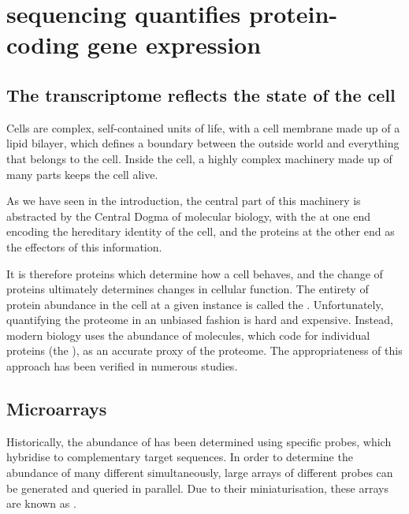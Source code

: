 \chapter{ sequencing quantifies protein-coding gene expression}

\section{The transcriptome reflects the state of the cell}

Cells are complex, self-contained units of life, with a cell membrane made up of
a lipid bilayer, which defines a boundary between the outside world and
everything that belongs to the cell. Inside the cell, a highly complex machinery
made up of many parts keeps the cell alive.

As we have seen in the introduction, the central part of this machinery is
abstracted by the Central Dogma of molecular biology, with the \dna at one end
encoding the hereditary identity of the cell, and the proteins at the other end
as the effectors of this information.

It is therefore proteins which determine how a cell behaves, and the change of
proteins ultimately determines changes in cellular function. The entirety of
protein abundance in the cell at a given instance is called the
. Unfortunately, quantifying the proteome in an unbiased
fashion is hard and expensive\todo[ref]{}. Instead, modern biology uses the
abundance of \mrna molecules, which code for individual proteins (the
), as an accurate proxy of the proteome. The
appropriateness of this approach has been verified in numerous
studies\todo[ref]{}.


\section{Microarrays}

Historically, the abundance of \mrna has been determined using specific probes,
which hybridise to complementary target \mrna sequences. In order to determine
the abundance of many different \mrna[s] simultaneously, large arrays of
different probes can be generated and queried in parallel. Due to their
miniaturisation, these arrays are known as .

